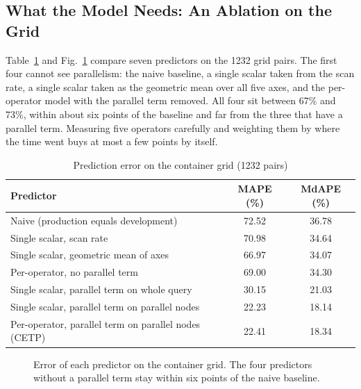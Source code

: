 \documentclass[runningheads]{llncs}
\begin{document}
\subsection{What the Model Needs: An Ablation on the Grid}
\label{sec:ablation}

Table~\ref{tab:ablation} and Fig.~\ref{fig:ablation} compare seven predictors
on the 1232 grid pairs. The first four cannot see parallelism: the naive
baseline, a single scalar taken from the scan rate, a single scalar taken as
the geometric mean over all five axes, and the per-operator model with the
parallel term removed. All four sit between 67\% and 73\%, within about six
points of the baseline and far from the three that have a parallel term.
Measuring five operators carefully and weighting them by where the time went
buys at most a few points by itself.

\begin{table}[t]
\centering
\caption{Prediction error on the container grid (1232 pairs)}
\label{tab:ablation}
\begin{tabular}{lcc}
\toprule
Predictor & MAPE (\%) & MdAPE (\%) \\
\midrule
Naive (production equals development) & 72.52 & 36.78 \\
Single scalar, scan rate & 70.98 & 34.64 \\
Single scalar, geometric mean of axes & 66.97 & 34.07 \\
Per-operator, no parallel term & 69.00 & 34.30 \\
\midrule
Single scalar, parallel term on whole query & 30.15 & 21.03 \\
Single scalar, parallel term on parallel nodes & 22.23 & 18.14 \\
Per-operator, parallel term on parallel nodes (CETP) & 22.41 & 18.34 \\
\bottomrule
\end{tabular}
\end{table}

\begin{figure}[t]
\centering
{}
\caption{Error of each predictor on the container grid. The four predictors
without a parallel term stay within six points of the naive baseline.}
\label{fig:ablation}
\end{figure}
\end{document}
